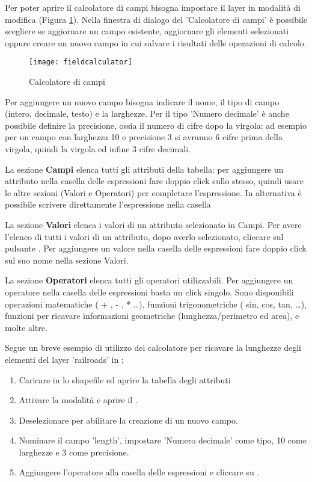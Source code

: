 Per poter aprire il calcolatore di campi bisogna impostare il layer in 
modalità di modifica (Figura \ref{fig:field_calculator}). 
Nella finestra di dialogo del 'Calcolatore di campi' è possibile scegliere se
aggiornare un campo esistente, aggiornare gli elementi selezionati oppure 
creare un nuovo campo in cui salvare i risultati delle operazioni di calcolo.

\begin{figure}[ht]
  \centering
    \texttt{[image: fieldcalculator]}
    \caption{Calcolatore di campi \nixcaption}\label{fig:field_calculator}
\end{figure}

Per aggiungere un nuovo campo bisogna indicare il nome, il tipo di campo 
(intero, decimale, testo) e la larghezze. Per il tipo 'Numero decimale' è
anche possibile definire la precisione, ossia il numero di cifre dopo la
virgola: ad esempio per un campo con larghezza 10 e precisione 3 si avranno 
6 cifre prima della virgola, quindi la virgola ed infine 3 cifre decimali.

La sezione \textbf{Campi} elenca tutti gli attributi della tabella: per aggiungere un
attributo nella casella delle espressioni fare doppio click sullo stesso, quindi 
usare le altre sezioni (Valori e Operatori) per completare l'espressione.
In alternativa è possibile scrivere direttamente l'espressione nella casella

La sezione \textbf{Valori} elenca i valori di un attributo selezionato in Campi. 
Per avere l'elenco di tutti i valori di un attributo, dopo averlo selezionato, cliccare 
sul pulsante  .
Per aggiungere un valore nella casella delle espressioni fare doppio click sul suo nome 
nella sezione Valori.

La sezione \textbf{Operatori} elenca tutti gli operatori utilizzabili. Per aggiungere un
operatore nella casella delle espressioni basta un click singolo. Sono disponibili 
operazioni matematiche ( + , - , * \dots), funzioni trigonometriche ( sin, cos, tan, \dots),
funzioni per ricavare informazioni geometriche (lunghezza/perimetro ed area), e molte altre.

Segue un breve esempio di utilizzo del calcolatore per ricavare la lunghezze degli 
elementi del layer 'railroads' in :

\begin{enumerate}
\item Caricare in \qg lo shapefile  ed aprire la tabella degli attributi
\item Attivare la modalità  e aprire il 
.
\item Deselezionare  per abilitare la creazione di un nuovo campo.
\item Nominare il campo 'length', impostare 'Numero decimale' come tipo, 10 come larghezze e 3 
come precisione.
\item Aggiungere l'operatore  alla casella delle espressioni e cliccare su .
\end{enumerate}

